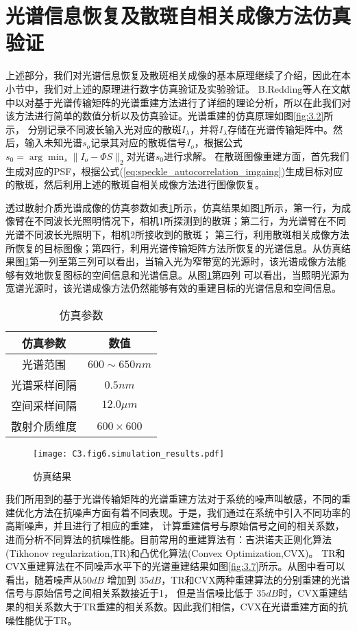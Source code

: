 \section{光谱信息恢复及散斑自相关成像方法仿真验证}
上述部分，我们对光谱信息恢复及散斑相关成像的基本原理继续了介绍，因此在本小节中，我们对上述的原理进行数字仿真验证及实验验证。
B.Redding等人在文献中以对基于光谱传输矩阵的光谱重建方法进行了详细的理论分析，所以在此我们对该方法进行简单的数值分析以及仿真验证。光谱重建的仿真原理如图\ref{fig:3.2}所示，
分别记录不同波长输入光对应的散斑$I_\lambda$，并将$I_\lambda$存储在光谱传输矩阵中。然后，输入未知光谱$s_{o}$记录其对应的散斑信号$I_{o}$，根据公式$s_{0}=\arg{\min_s \| I_{o} -{\Phi}S \|_2}$对光谱$s_{0}$进行求解。
在散斑图像重建方面，首先我们生成对应的PSF，根据公式(\ref{eq:speckle_autocorrelation_imgaing})生成目标对应的散斑，然后利用上述的散斑自相关成像方法进行图像恢复。

透过散射介质光谱成像的仿真参数如表\ref{table:1.1}所示，仿真结果如图\ref{fig:3.6}所示，第一行，为成像臂在不同波长光照明情况下，相机1所探测到的散斑；第二行，为光谱臂在不同光谱不同波长光照明下，相机2所接收到的散斑；
第三行，利用散斑相关成像方法所恢复的目标图像；第四行，利用光谱传输矩阵方法所恢复的光谱信息。从仿真结果图\ref{fig:3.6}第一列至第三列可以看出，当输入光为窄带宽的光源时，该光谱成像方法能够有效地恢复图标的空间信息和光谱信息。从图\ref{fig:3.6}第四列
可以看出，当照明光源为宽谱光源时，该光谱成像方法仍然能够有效的重建目标的光谱信息和空间信息。

\begin{table}[!htbp]
\begin{center}
\caption{仿真参数}
\label{table:1.1}
\begin{tabular}{|c|c|}
\hline
\textbf{仿真参数} & \textbf{数值}\\
\hline
光谱范围 & $600 \sim 650 nm$ \\
\hline
光谱采样间隔 & $0.5  nm$\\
\hline
空间采样间隔 & $12.0 \mu m$ \\
\hline
散射介质维度 & $600 \times 600$ \\
\hline
\end{tabular}
\end{center}
\end{table}

\begin{figure}[htp]
	\centering
	\texttt{[image: C3.fig6.simulation\_results.pdf]}
	\caption{仿真结果}
	\label{fig:3.6}
\end{figure}

我们所用到的基于光谱传输矩阵的光谱重建方法对于系统的噪声叫敏感，不同的重建优化方法在抗噪声方面有着不同表现。于是，我们通过在系统中引入不同功率的高斯噪声，并且进行了相应的重建，
计算重建信号与原始信号之间的相关系数，进而分析不同算法的抗噪性能。目前常用的重建算法有：吉洪诺夫正则化算法(Tikhonov regularization,TR)和凸优化算法(Convex Optimization,CVX)。
TR和CVX重建算法在不同噪声水平下的光谱重建结果如图\ref{fig:3.7}所示。从图中看可以看出，随着噪声从$50 dB$ 增加到 $35 dB$，TR和CVX两种重建算法的分别重建的光谱信号与原始信号之间相关系数接近于1，
但是当信噪比低于 $35 dB$时，CVX重建结果的相关系数大于TR重建的相关系数。因此我们相信，CVX在光谱重建方面的抗噪性能优于TR。

